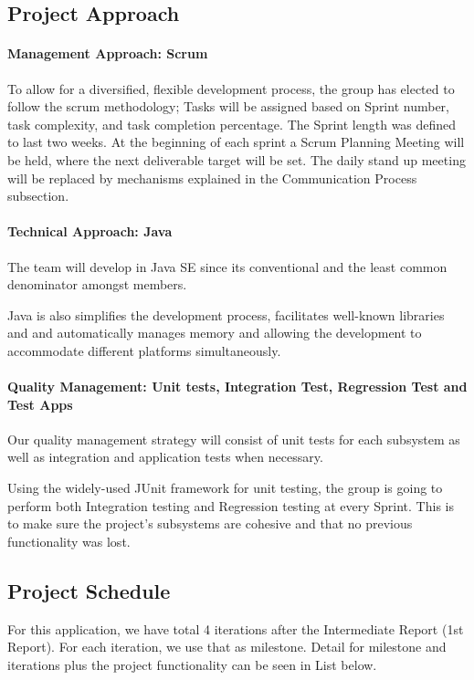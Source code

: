\documentclass[11pt]{article}
\begin{document}
\subsection{Project Approach}
	\paragraph{Management Approach: Scrum}
	To allow for a diversified, flexible development process, the group has elected to follow the scrum methodology; Tasks will be assigned based on Sprint number, task complexity, and task completion percentage.
	The Sprint length was defined to last two weeks. At the beginning of each sprint a Scrum Planning Meeting will be held, where the next deliverable target will be set. The daily stand up meeting will be replaced by mechanisms explained in the Communication Process subsection.
	
	\paragraph{Technical Approach: Java} The team will develop in Java SE since its conventional and the least common denominator amongst members. 
	
	 Java is also simplifies the development process, facilitates well-known libraries and and automatically manages memory and allowing the development to accommodate different platforms simultaneously. 

	\paragraph{Quality Management: Unit tests, Integration Test, Regression Test and Test Apps}
	Our quality management strategy will consist of unit tests for each subsystem as well as integration and application tests when necessary.  
		
	Using the widely-used JUnit framework for unit testing, the group is going to perform both Integration testing and Regression testing at every Sprint. This is to make sure the project's subsystems are cohesive and that no previous functionality was lost.
		
		
\subsection{Project Schedule}

 For this application, we have total 4 iterations after the Intermediate Report (1st Report). For each iteration, we use that as milestone. Detail for milestone and iterations plus the project functionality can be seen in List below.
\end{document}

